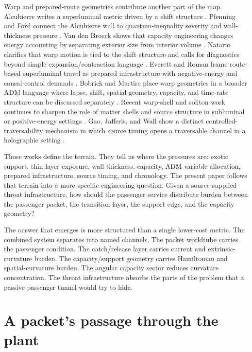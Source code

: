\documentclass[11pt]{article}
\begin{document}
Warp and prepared-route geometries contribute another part of the map. Alcubierre writes a superluminal metric driven by a shift structure \citep{alcubierre_1994}. Pfenning and Ford connect the Alcubierre wall to quantum-inequality severity and wall-thickness pressure \citep{pfenning_ford_1997}. Van den Broeck shows that capacity engineering changes energy accounting by separating exterior size from interior volume \citep{van_den_broeck_1999}. Natario clarifies that warp motion is tied to the shift structure and calls for diagnostics beyond simple expansion/contraction language \citep{natario_2002}. Everett and Roman frame route-based superluminal travel as prepared infrastructure with negative-energy and causal-control demands \citep{everett_roman_1997}. Bobrick and Martire place warp geometries in a broader ADM language where lapse, shift, spatial geometry, capacity, and time-rate structure can be discussed separately \citep{bobrick_martire_2021}. Recent warp-shell and soliton work continues to sharpen the role of matter shells and source structure in subluminal or positive-energy settings \citep{lentz_2021,fuchs_2024}. Gao, Jafferis, and Wall show a distinct controlled-traversability mechanism in which source timing opens a traversable channel in a holographic setting \citep{gao_jafferis_wall_2017}.

Those works define the terrain. They tell us where the pressures are: exotic support, thin-layer exposure, wall thickness, capacity, ADM variable allocation, prepared infrastructure, source timing, and chronology. The present paper follows that terrain into a more specific engineering question. Given a source-supplied throat infrastructure, how should the passenger service distribute burden between the passenger packet, the transition layer, the support edge, and the capacity geometry?

The answer that emerges is more structured than a single lower-cost metric. The combined system separates into named channels. The packet worldtube carries the passenger condition. The catch/release layer carries current and extrinsic-curvature burden. The capacity/support geometry carries Hamiltonian and spatial-curvature burden. The angular capacity sector reduces curvature concentration. The throat infrastructure absorbs the parts of the problem that a passive passenger tunnel would try to hide.


\section{A packet's passage through the plant}
\end{document}
